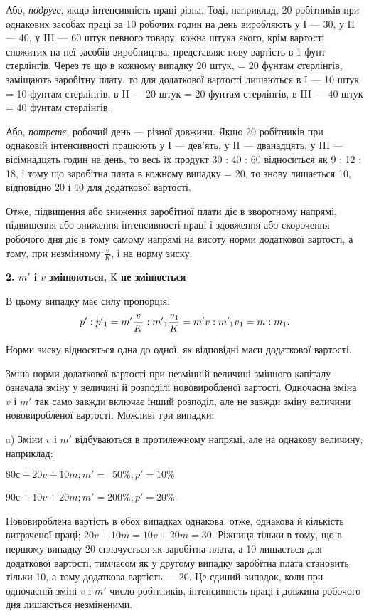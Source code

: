 Або, \emph{подруге}, якщо інтенсивність праці різна. Тоді, наприклад,
20 робітників при однакових засобах праці за 10 робочих
годин на день виробляють у І — 30, у II — 40, у III — 60 штук
певного товару, кожна штука якого, крім вартості спожитих
на неї засобів виробництва, представляє нову вартість в 1 фунт
стерлінгів. Через те що в кожному випадку 20 штук, = 20
фунтам стерлінгів, заміщають заробітну плату, то для додаткової
вартості лишаються в І — 10 штук = 10 фунтам стерлінгів,
в II — 20 штук = 20 фунтам стерлінгів, в III — 40 штук = 40 фунтам
стерлінгів.

Або, \emph{потретє}, робочий день — різної довжини. Якщо 20 робітників
при однаковій інтенсивності працюють у І — дев’ять,
у II — дванадцять, у III — вісімнадцять годин на день, то весь їх
продукт 30 : 40 : 60 відноситься як 9 : 12 : 18, і тому що заробітна
плата в кожному випадку = 20, то знову лишається 10, відповідно
20 і 40 для додаткової вартості.

Отже, підвищення або зниження заробітної плати діє в зворотному
напрямі, підвищення або зниження інтенсивності праці
і здовження або скорочення робочого дня діє в тому самому
напрямі на висоту норми додаткової вартості, а тому, при незмінному
$\frac{v}{K}$, і на норму зиску.

\begin{center}
\textbf{2. $m'$ і $v$ змінюються, $К$ не змінюється}
\end{center}
В цьому випадку має силу пропорція:\[
p': p'\textsubscript{1} = m' \frac{v}{K} : m'\textsubscript{1} \frac{v\textsubscript{1}}{K} = m'v : m'\textsubscript{1}v\textsubscript{1} = m : m\textsubscript{1}.\]

Норми зиску відносяться одна до одної, як відповідні маси
додаткової вартості.

Зміна норми додаткової вартості при незмінній величині змінного
капіталу означала зміну у величині й розподілі нововиробленої
вартості. Одночасна зміна $v$ і $m'$ так само завжди включає
інший розподіл, але не завжди зміну величини нововиробленої
вартості. Можливі три випадки:

a) Зміни $v$ і $m'$ відбуваються в протилежному напрямі, але
на однакову величину; наприклад:
\begin{center}
$80 с + 20 v + 10 m; m' = \phantom{0}50\%, p' = 10\%$

$90 с + 10 v + 20 m; m' = 200\%, p' = 20\%$.
\end{center}
Нововироблена вартість в обох випадках однакова, отже, однакова
й кількість витраченої праці; $20 v + 10 m = 10 v + 20 m = 30$.
Ріжниця тільки в тому, що в першому випадку 20 сплачується
як заробітна плата, а 10 лишається для додаткової вартості,
тимчасом як у другому випадку заробітна плата становить
тільки 10, а тому додаткова вартість — 20. Це єдиний випадок,
коли при одночасній зміні $v$ і $m'$ число робітників, інтенсивність
праці і довжина робочого дня лишаються незміненими.

